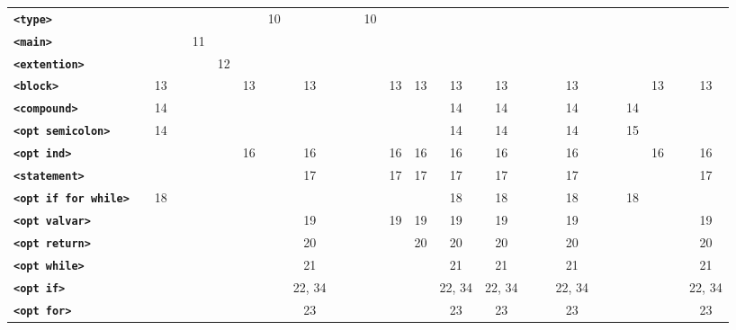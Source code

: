 \documentclass{article}
\begin{document}
\begin{table}[H]
{\begin{minipage}{0.88\textheight}
{\begin{tabular}{l *{24}{c}}
    \textbf{\large\texttt{<type>}} & & & & & & & {\large 10} & & & & {\large 10} & & & & & & & & & & & & & \\
    \textbf{\large\texttt{<main>}} & & & & {\large 11} & & & & & & & & & & & & & & & & & & & & \\
    \textbf{\large\texttt{<extention>}} & & & & & {\large 12} & & & & & & & & & & & & & & & & & & & \\
    \textbf{\large\texttt{<block>}} & & {\large 13} & & & & {\large 13} & & {\large 13} & & & & {\large 13} & {\large 13} & {\large 13} & {\large 13} & & & {\large 13} & & & & {\large 13} & & {\large 13} \\
    \textbf{\large\texttt{<compound>}} & & {\large 14} & & & & & & & & & & & & {\large 14} & {\large 14} & & & {\large 14} & & & {\large 14} & & & \\
    \textbf{\large\texttt{<opt semicolon>}} & & {\large 14} & & & & & & & & & & & & {\large 14} & {\large 14} & & & {\large 14} & & & {\large 15} & & & \\
    \textbf{\large\texttt{<opt ind>}} & & & & & & {\large 16} & & {\large 16} & & & & {\large 16} & {\large 16} & {\large 16} & {\large 16} & & & {\large 16} & & & & {\large 16} & & {\large 16} \\
    \textbf{\large\texttt{<statement>}} & & & & & & & & {\large 17} & & & & {\large 17} & {\large 17} & {\large 17} & {\large 17} & & & {\large 17} & & & & & & {\large 17} \\
    \textbf{\large\texttt{<opt if for while>}} & & {\large 18} & & & & & & & & & & & & {\large 18} & {\large 18} & & & {\large 18} & & & {\large 18} & & & \\
    \textbf{\large\texttt{<opt valvar>}} & & & & & & & & {\large 19} & & & & {\large 19} & {\large 19} & {\large 19} & {\large 19} & & & {\large 19} & & & & & & {\large 19} \\
    \textbf{\large\texttt{<opt return>}} & & & & & & & & {\large 20} & & & & & {\large 20} & {\large 20} & {\large 20} & & & {\large 20} & & & & & & {\large 20} \\
    \textbf{\large\texttt{<opt while>}} & & & & & & & & {\large 21} & & & & & & {\large 21} & {\large 21} & & & {\large 21} & & & & & & {\large 21} \\
    \textbf{\large\texttt{<opt if>}} & & & & & & & & {\large 22, 34} & & & & & & {\large 22, 34} & {\large 22, 34} & & & {\large 22, 34} & & & & & & {\large 22, 34} \\
    \textbf{\large\texttt{<opt for>}} & & & & & & & & {\large 23} & & & & & & {\large 23} & {\large 23} & & & {\large 23} & & & & & & {\large 23} \\

\end{tabular}}
\end{minipage}}
\end{table}
\end{document}

